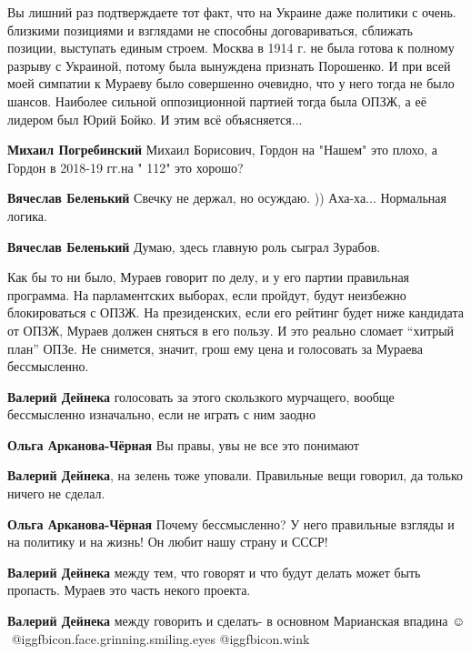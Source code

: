\begin{itemize}
\begin{itemize}
Вы лишний раз подтверждаете тот факт, что на Украине даже политики с очень.
близкими позициями и взглядами не способны договариваться, сближать позиции,
выступать единым строем. Москва в 1914 г. не была готова к полному разрыву с
Украиной, потому была вынуждена признать Порошенко. И при всей моей симпатии к
Мураеву было совершенно очевидно, что у него тогда не было шансов. Наиболее
сильной оппозиционной партией тогда была ОПЗЖ, а её лидером был Юрий Бойко. И
этим всё объясняется...

\textbf{Михаил Погребинский} Михаил Борисович, Гордон на "Нашем" это плохо, а Гордон в 2018-19 гг.на " 112" это хорошо?

\textbf{Вячеслав Беленький} Свечку не держал, но осуждаю. )) Аха-ха... Нормальная логика.

\textbf{Вячеслав Беленький} Думаю, здесь главную роль сыграл Зурабов.

\end{itemize} %


Как бы то ни было, Мураев говорит по делу, и у его партии правильная программа.
На парламентских выборах, если пройдут, будут неизбежно блокироваться с ОПЗЖ.
На президенских, если его рейтинг будет ниже кандидата от ОПЗЖ, Мураев должен
сняться в его пользу. И это реально сломает \enquote{хитрый план} ОПЗе. Не снимется,
значит, грош ему цена и голосовать за Мураева бессмысленно.

\begin{itemize} %
\textbf{Валерий Дейнека} голосовать за этого скользкого мурчащего, вообще бессмысленно изначально, если не играть с ним заодно

\textbf{Ольга Арканова-Чёрная} Вы правы, увы не все это понимают

\textbf{Валерий Дейнека}, на зелень тоже уповали. Правильные вещи говорил, да только ничего не сделал.

\textbf{Ольга Арканова-Чёрная} Почему бессмысленно? У него правильные взгляды и на политику и на жизнь! Он любит нашу страну и СССР!

\textbf{Валерий Дейнека} между тем, что говорят и что будут делать может быть пропасть. Мураев это часть некого проекта.

\textbf{Валерий Дейнека} между говорить и сделать- в основном Марианская впадина ☺ ️  @igg{fbicon.face.grinning.smiling.eyes}  @igg{fbicon.wink} 


\end{itemize}
\end{itemize}
